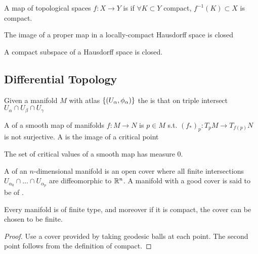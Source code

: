 \documentclass{article}
\begin{document}
\begin{definition}
	A map of topological spaces $f:X \to Y$ is  if $\forall K \subset Y$ compact, $f^{-1}(K)\subset X$ is compact. 
\end{definition}

\begin{prop}
	The image of a proper map in a locally-compact Hausdorff space is closed
\end{prop}

\begin{prop}
	A compact subspace of a Hausdorff space is closed. 
\end{prop}

\subsection{Differential Topology}

\begin{definition}
	Given a manifold $M$ with atlas $\left\{ (U_\alpha,\phi_\alpha) \right\}$ the  is that on triple intersect $U_\alpha \cap U_\beta \cap U_\gamma$
\end{definition}

\begin{definition}
	A  of a smooth map of manifolds $f:M\to N$ is $p \in M$ s.t. $(f_\ast)_p:T_pM \to T_{f(p)}N$ is not surjective. A  is the image of a critical point
\end{definition}

\begin{theorem}[Sard]
	The set of critical values of a smooth map has measure 0.
\end{theorem}



\begin{definition}
	A  of an $n$-dimensional manifold is an open cover where all finite intersections $U_{\alpha_0} \cap \dots \cap U_{\alpha_p}$ are diffeomorphic to $\mathbb{R}^n$. A manifold with a good cover is said to be of . 
\end{definition}

\begin{theorem}
	Every manifold is of finite type, and moreover if it is compact, the cover can be chosen to be finite. 
\end{theorem}
\begin{proof}
	Use a cover provided by taking geodesic balls at each point. The second point follows from the definition of compact.
\end{proof}
\end{document}
